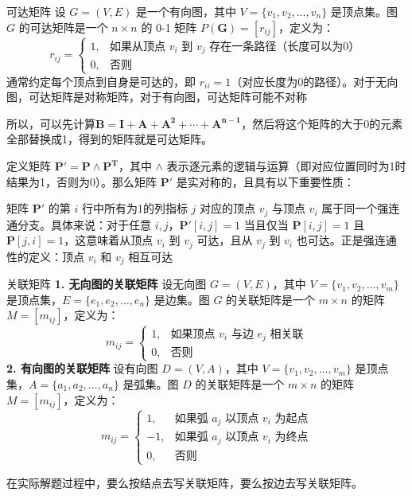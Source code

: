 \begin{definition}{可达矩阵}{}
设 $G = (V, E)$ 是一个有向图，其中 $V = \{v_1, v_2, \ldots, v_n\}$ 是顶点集。图 $G$ 的可达矩阵是一个 $n \times n$ 的 0-1 矩阵 $P(\bm{G}) = [r_{ij}]$，定义为：
\[
r_{ij} = 
\begin{cases}
1, & \text{如果从顶点 } v_i \text{ 到 } v_j \text{ 存在一条路径（长度可以为0）} \\
0, & \text{否则}
\end{cases}
\]
通常约定每个顶点到自身是可达的，即 $r_{ii} = 1$（对应长度为0的路径）。对于无向图，可达矩阵是对称矩阵，对于有向图，可达矩阵可能不对称
\end{definition}
所以，可以先计算$\bm{B}=\bm{I}+\bm{A}+\bm{A^2}+\cdots+\bm{A^{n-1}}$，然后将这个矩阵的大于0的元素全部替换成1，得到的矩阵就是可达矩阵。

定义矩阵 $\bm{P'} = \bm{P} \land \bm{P^T}$，其中 $\land$ 表示逐元素的逻辑与运算（即对应位置同时为1时结果为1，否则为0）。那么矩阵 $\bm{P'}$ 是实对称的，且具有以下重要性质：

矩阵 $\bm{P'}$ 的第 $i$ 行中所有为1的列指标 $j$ 对应的顶点 $v_j$ 与顶点 $v_i$ 属于同一个强连通分支。具体来说：对于任意 $i,j$，$\bm{P'}[i,j] = 1$ 当且仅当 $\bm{P}[i,j] = 1$ 且 $\bm{P}[j,i] = 1$，这意味着从顶点 $v_i$ 到 $v_j$ 可达，且从 $v_j$ 到 $v_i$ 也可达。正是强连通性的定义：顶点 $v_i$ 和 $v_j$ 相互可达

\begin{definition}{关联矩阵}{}
\textbf{1. 无向图的关联矩阵}
设无向图 $G = (V, E)$，其中 $V = \{v_1, v_2, \ldots, v_m\}$ 是顶点集，$E = \{e_1, e_2, \ldots, e_n\}$ 是边集。图 $G$ 的关联矩阵是一个 $m \times n$ 的矩阵 $M = [m_{ij}]$，定义为：
\[
m_{ij} = 
\begin{cases}
1, & \text{如果顶点 } v_i \text{ 与边 } e_j \text{ 相关联} \\
0, & \text{否则}
\end{cases}
\]
\textbf{2. 有向图的关联矩阵}
设有向图 $D = (V, A)$，其中 $V = \{v_1, v_2, \ldots, v_m\}$ 是顶点集，$A = \{a_1, a_2, \ldots, a_n\}$ 是弧集。图 $D$ 的关联矩阵是一个 $m \times n$ 的矩阵 $M = [m_{ij}]$，定义为：
\[
m_{ij} = 
\begin{cases}
1, & \text{如果弧 } a_j \text{ 以顶点 } v_i \text{ 为起点} \\
-1, & \text{如果弧 } a_j \text{ 以顶点 } v_i \text{ 为终点} \\
0, & \text{否则}
\end{cases}
\]
\end{definition}
在实际解题过程中，要么按结点去写关联矩阵，要么按边去写关联矩阵。

